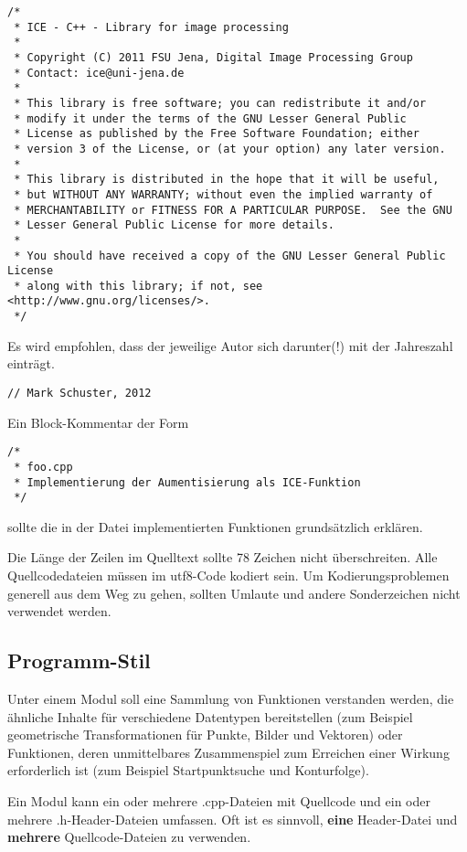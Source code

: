 \documentclass[10pt,titlepage]{article}
\begin{document}
{{\begin{verbatim}
/*
 * ICE - C++ - Library for image processing 
 *
 * Copyright (C) 2011 FSU Jena, Digital Image Processing Group
 * Contact: ice@uni-jena.de
 *
 * This library is free software; you can redistribute it and/or
 * modify it under the terms of the GNU Lesser General Public
 * License as published by the Free Software Foundation; either
 * version 3 of the License, or (at your option) any later version.
 *
 * This library is distributed in the hope that it will be useful,
 * but WITHOUT ANY WARRANTY; without even the implied warranty of
 * MERCHANTABILITY or FITNESS FOR A PARTICULAR PURPOSE.  See the GNU
 * Lesser General Public License for more details.
 *
 * You should have received a copy of the GNU Lesser General Public License 
 * along with this library; if not, see <http://www.gnu.org/licenses/>.
 */
\end{verbatim}

Es wird empfohlen, dass der jeweilige Autor sich darunter(!) mit der Jahreszahl
einträgt.

\begin{verbatim}
// Mark Schuster, 2012
\end{verbatim}

Ein Block-Kommentar der Form
\begin{verbatim}
/*
 * foo.cpp
 * Implementierung der Aumentisierung als ICE-Funktion
 */
\end{verbatim}
sollte die in der Datei implementierten Funktionen grundsätzlich erklären.

Die Länge der Zeilen im Quelltext sollte 78 Zeichen nicht überschreiten. Alle
Quellcodedateien müssen im utf8-Code kodiert sein. Um Kodierungsproblemen
generell aus dem Weg zu gehen, sollten Umlaute und andere Sonderzeichen nicht
verwendet werden. 

\subsection{Programm-Stil}
Unter einem Modul soll eine Sammlung von Funktionen verstanden werden, die
ähnliche Inhalte für verschiedene Datentypen bereitstellen (zum Beispiel
geometrische Transformationen für Punkte, Bilder und Vektoren) oder Funktionen,
deren unmittelbares Zusammenspiel zum Erreichen einer Wirkung erforderlich
ist (zum Beispiel Startpunktsuche und Konturfolge). 

Ein Modul kann ein oder mehrere .cpp-Dateien mit Quellcode und ein oder
mehrere .h-Header-Dateien umfassen. Oft ist es sinnvoll, {\bf eine} 
Header-Datei und {\bf mehrere} Quellcode-Dateien zu verwenden.

}}
\end{document}
